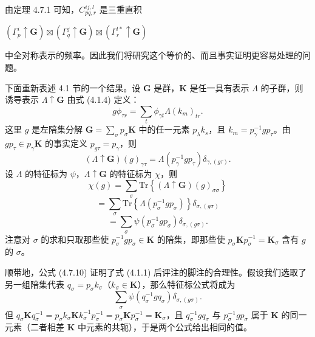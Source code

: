 由定理 4.7.1 可知，$C^{ij, l}_{pq, r}$ 是三重直积
\begin{center}
$\left(\Gamma^{i}_{p} \uparrow \mathbf{G}\right) \boxtimes \left(\Gamma^{j}_{q} \uparrow \mathbf{G}\right) \boxtimes \left(\Gamma^{l*}_{r} \uparrow \mathbf{G}\right)$
\end{center}
中全对称表示的频率。因此我们将研究这个等价的、而且事实证明更容易处理的问题。

下面重新表述 4.1 节的一个结果。设 $\mathbf{G}$ 是群，$\mathbf{K}$ 是任一具有表示 $\Lambda$ 的子群，则诱导表示 $\Lambda \uparrow \mathbf{G}$ 由式 (4.1.4) 定义：
\begin{equation*}
g\phi_{\tau r} = \sum_{t}\phi_{\gamma t}\Lambda(k_{m})_{tr}.
\tag{4.7.6}
\end{equation*}
这里 $g$ 是左陪集分解 $\mathbf{G} = \sum_{\sigma}p_{\sigma}\mathbf{K}$ 中的任一元素 $p_{\lambda}k_{s}$，且 $k_{m} = p^{-1}_{\gamma}gp_{\tau}$。由 $gp_{\tau} \in p_{\gamma}\mathbf{K}$ 的事实定义 $p_{g\tau} = p_{\gamma}$，则
\begin{equation*}
(\Lambda \uparrow \mathbf{G})(g)_{\gamma\tau} = \Lambda(p^{-1}_{\gamma}gp_{\tau})\delta_{\gamma, (g\tau)}.
\tag{4.7.7}
\end{equation*}
设 $\Lambda$ 的特征标为 $\psi$，$\Lambda \uparrow \mathbf{G}$ 的特征标为 $\chi$，则
\begin{equation*}
\chi(g) = \sum_{\sigma}\mathrm{Tr}\left\{(\Lambda \uparrow \mathbf{G})(g)_{\sigma\sigma}\right\}
\tag{4.7.8}
\end{equation*}
\begin{equation*}
= \sum_{\sigma}\mathrm{Tr}\left\{\Lambda(p^{-1}_{\sigma}gp_{\sigma})\right\}\delta_{\sigma, (g\sigma)}
\tag{4.7.9}
\end{equation*}
\begin{equation*}
= \sum_{\sigma}\psi(p^{-1}_{\sigma}gp_{\sigma})\delta_{\sigma, (g\sigma)}.
\tag{4.7.10}
\end{equation*}
注意对 $\sigma$ 的求和只取那些使 $p^{-1}_{\sigma}gp_{\sigma} \in \mathbf{K}$ 的陪集，即那些使 $p_{\sigma}\mathbf{K}p^{-1}_{\sigma} = \mathbf{K}_{\sigma}$ 含有 $g$ 的 $\sigma$。

顺带地，公式 (4.7.10) 证明了式 (4.1.1) 后评注的脚注的合理性。假设我们选取了另一组陪集代表 $q_{\sigma} = p_{\sigma}k_{\sigma}$（$k_{\sigma} \in \mathbf{K}$），那么特征标公式将成为
\begin{equation*}
\sum_{\sigma}\psi(q^{-1}_{\sigma}gq_{\sigma})\delta_{\sigma, (g\sigma)}.
\tag{4.7.11}
\end{equation*}
但 $q_{\sigma}\mathbf{K}q^{-1}_{\sigma} = p_{\sigma}k_{\sigma}\mathbf{K}k^{-1}_{\sigma}p^{-1}_{\sigma} = p_{\sigma}\mathbf{K}p^{-1}_{\sigma} = \mathbf{K}_{\sigma}$，且 $q^{-1}_{\sigma}gq_{\sigma}$ 与 $p^{-1}_{\sigma}gp_{\sigma}$ 属于 $\mathbf{K}$ 的同一元素（二者相差 $\mathbf{K}$ 中元素的共轭），于是两个公式给出相同的值。

